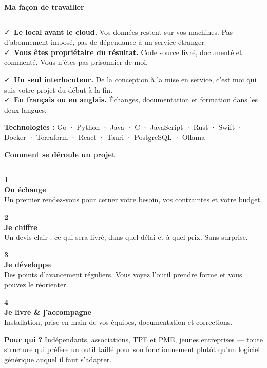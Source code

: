 \documentclass[10pt,a4paper]{article}
\newcommand{\nfsection}[1]{%
  \par\vspace{0.7em}%
  {\color{nfdark}\large\bfseries #1}\\[0.25em]%
  {\color{nfcyan}\rule{\linewidth}{1.2pt}}\par\vspace{-0.15em}%
}
\newcommand{\nfbullet}{{\color{nfcyan}\faCheck}~}
\newcommand{\nfstep}[3]{%
  \begin{minipage}[t]{0.227\linewidth}\raggedright
    {\color{nfcyan}\fontsize{19}{19}\selectfont\bfseries #1}\\[0.25em]
    {\bfseries\footnotesize\color{nfdark} #2}\\[0.2em]
    {\scriptsize #3}
  \end{minipage}%
}
\begin{document}
\nfsection{Ma façon de travailler}

\vspace{-0.6em}
\begin{minipage}[t]{0.485\linewidth}
\footnotesize
\nfbullet\textbf{Le local avant le cloud.} Vos données restent sur vos
machines. Pas d'abonnement imposé, pas de dépendance à un service étranger.\\[0.5em]
\nfbullet\textbf{Vous êtes propriétaire du résultat.} Code source livré,
documenté et commenté. Vous n'êtes pas prisonnier de moi.
\end{minipage}\hfill
\begin{minipage}[t]{0.485\linewidth}
\footnotesize
\nfbullet\textbf{Un seul interlocuteur.} De la conception à la mise en service,
c'est moi qui suis votre projet du début à la fin.\\[0.5em]
\nfbullet\textbf{En français ou en anglais.} Échanges, documentation et
formation dans les deux langues.
\end{minipage}

\vspace{0.9em}

{\footnotesize\color{nfdark}\textbf{Technologies :} Go · Python · Java · C · JavaScript ·
Rust · Swift · Docker · Terraform · React · Tauri · PostgreSQL · Ollama\par}
\vspace{0.45em}

\nfsection{Comment se déroule un projet}

\vspace{-0.4em}
\nfstep{1}{On échange}{Un premier rendez-vous pour cerner votre besoin, vos
contraintes et votre budget.}\hfill
\nfstep{2}{Je chiffre}{Un devis clair : ce qui sera livré, dans quel délai et
à quel prix. Sans surprise.}\hfill
\nfstep{3}{Je développe}{Des points d'avancement réguliers. Vous voyez l'outil
prendre forme et vous pouvez le réorienter.}\hfill
\nfstep{4}{Je livre \& j'accompagne}{Installation, prise en main de vos équipes,
documentation et corrections.}

\vspace{1.1em}

{\setlength{\fboxsep}{8pt}%
\colorbox{nfgrey}{%
\begin{minipage}{\dimexpr\linewidth-16pt\relax}
\footnotesize\textbf{Pour qui ?} Indépendants, associations, TPE et PME, jeunes
entreprises — toute structure qui préfère un outil taillé pour son
fonctionnement plutôt qu'un logiciel générique auquel il faut s'adapter.
\end{minipage}}}
\end{document}
